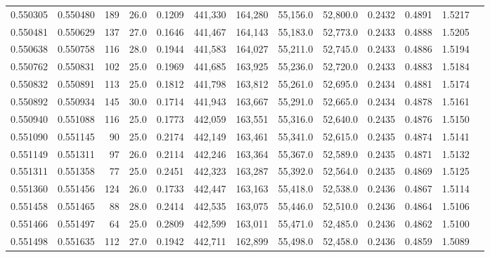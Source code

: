 \begin{tabular}{rrrrrrrrrrrrr}
0.550305 & 0.550480 &   189 & 26.0 &                                     0.1209 & 441,330 & 164,280 &  55,156.0 &  52,800.0 & 0.2432 & 0.4891 & 1.5217 \\
0.550481 & 0.550629 &   137 & 27.0 &                                     0.1646 & 441,467 & 164,143 &  55,183.0 &  52,773.0 & 0.2433 & 0.4888 & 1.5205 \\
0.550638 & 0.550758 &   116 & 28.0 &                                     0.1944 & 441,583 & 164,027 &  55,211.0 &  52,745.0 & 0.2433 & 0.4886 & 1.5194 \\
0.550762 & 0.550831 &   102 & 25.0 &                                     0.1969 & 441,685 & 163,925 &  55,236.0 &  52,720.0 & 0.2433 & 0.4883 & 1.5184 \\
0.550832 & 0.550891 &   113 & 25.0 &                                     0.1812 & 441,798 & 163,812 &  55,261.0 &  52,695.0 & 0.2434 & 0.4881 & 1.5174 \\
0.550892 & 0.550934 &   145 & 30.0 &                                     0.1714 & 441,943 & 163,667 &  55,291.0 &  52,665.0 & 0.2434 & 0.4878 & 1.5161 \\
0.550940 & 0.551088 &   116 & 25.0 &                                     0.1773 & 442,059 & 163,551 &  55,316.0 &  52,640.0 & 0.2435 & 0.4876 & 1.5150 \\
0.551090 & 0.551145 &    90 & 25.0 &                                     0.2174 & 442,149 & 163,461 &  55,341.0 &  52,615.0 & 0.2435 & 0.4874 & 1.5141 \\
0.551149 & 0.551311 &    97 & 26.0 &                                     0.2114 & 442,246 & 163,364 &  55,367.0 &  52,589.0 & 0.2435 & 0.4871 & 1.5132 \\
0.551311 & 0.551358 &    77 & 25.0 &                                     0.2451 & 442,323 & 163,287 &  55,392.0 &  52,564.0 & 0.2435 & 0.4869 & 1.5125 \\
0.551360 & 0.551456 &   124 & 26.0 &                                     0.1733 & 442,447 & 163,163 &  55,418.0 &  52,538.0 & 0.2436 & 0.4867 & 1.5114 \\
0.551458 & 0.551465 &    88 & 28.0 &                                     0.2414 & 442,535 & 163,075 &  55,446.0 &  52,510.0 & 0.2436 & 0.4864 & 1.5106 \\
0.551466 & 0.551497 &    64 & 25.0 &                                     0.2809 & 442,599 & 163,011 &  55,471.0 &  52,485.0 & 0.2436 & 0.4862 & 1.5100 \\
0.551498 & 0.551635 &   112 & 27.0 &                                     0.1942 & 442,711 & 162,899 &  55,498.0 &  52,458.0 & 0.2436 & 0.4859 & 1.5089 \\

\end{tabular}
